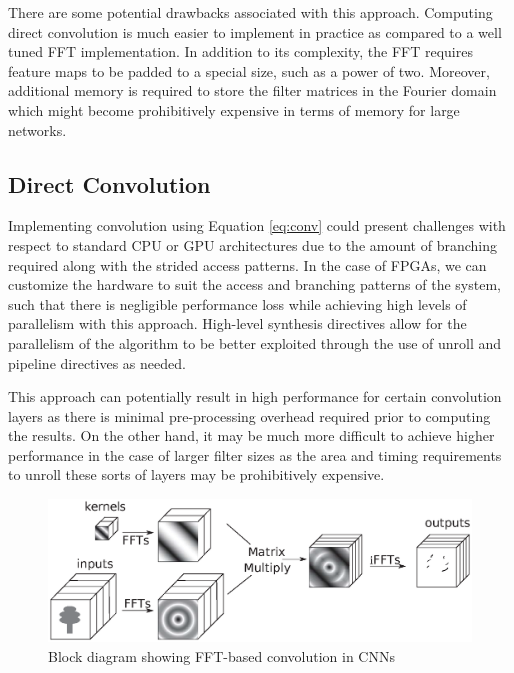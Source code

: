 \documentclass[conference,compsoc]{IEEEtran/IEEEtran}
\begin{document}
There are some potential drawbacks associated with this approach. Computing direct convolution is much easier to implement in practice as compared to a well tuned FFT implementation. In addition to its complexity, the FFT requires feature maps to be padded to a special size, such as a power of two. Moreover, additional memory is required to store the filter matrices in the Fourier domain which might become prohibitively expensive in terms of memory for large networks.

\subsection{Direct Convolution} 
Implementing convolution using Equation \ref{eq:conv} could present challenges with respect to standard CPU or GPU architectures
due to the amount of branching required along with the strided access patterns. In the case of FPGAs, we can customize the hardware 
to suit the access and branching patterns of the system, such that there is negligible performance loss while achieving high
levels of parallelism with this approach. High-level synthesis directives allow for the parallelism of the algorithm to be better
exploited through the use of unroll and pipeline directives as needed. 

This approach can potentially result in high performance for certain convolution layers as there is minimal pre-processing overhead
required prior to computing the results. On the other hand, it may be much more difficult to achieve higher performance in the case of
larger filter sizes as the area and timing requirements to unroll these sorts of layers may be prohibitively expensive. 

\begin{figure}[!h]
\begin{center}
\centering
\includegraphics[width=1\columnwidth]{CNN-FFT.eps}
\caption{Block diagram showing FFT-based convolution in CNNs}
\label{CNN-FFT}
\end{center}
\end{figure}
\end{document}
